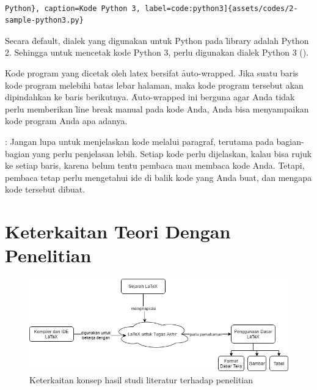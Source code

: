 \begin{lstlisting}[language={[latex]tex}]

Python}, caption=Kode Python 3, label=code:python3]{assets/codes/2-sample-python3.py}
\end{lstlisting}

Secara \f{default}, dialek yang digunakan untuk Python pada \f{library}  adalah Python 2.
Sehingga untuk mencetak kode Python 3, perlu digunakan dialek Python 3 ().

Kode program yang dicetak oleh \gls{latex} bersifat \f{auto-wrapped}.
Jika suatu baris kode program melebihi batas lebar halaman,
maka kode program tersebut akan dipindahkan ke baris berikutnya.
\f{Auto-wrapped} ini berguna agar Anda tidak perlu memberikan \f{line break} manual pada kode Anda,
Anda bisa menyampaikan kode program Anda apa adanya.

: Jangan lupa untuk menjelaskan kode melalui paragraf,
terutama pada bagian-bagian yang perlu penjelasan lebih.
Setiap kode perlu dijelaskan, kalau bisa rujuk ke setiap baris, karena belum tentu pembaca mau membaca kode Anda.
Tetapi, pembaca tetap perlu mengetahui ide di balik kode yang Anda buat, dan mengapa kode tersebut dibuat.



\section{Keterkaitan Teori Dengan Penelitian}
\label{sec:keterkaitan}

\begin{figure}
	\centering
	\includegraphics[width=\textwidth]{assets/pics/research_concept_map.png}
	\caption{Keterkaitan konsep hasil studi literatur terhadap penelitian}
	\label{fig:research_concept_map}
\end{figure}

